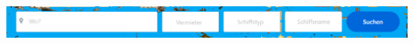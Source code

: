 \documentclass[12pt]{article}
\theoremstyle{definition}
\begin{document}
\begin{center}\includegraphics[width=15cm,height=20cm,keepaspectratio]{Startseite2.png}\end{center}
\end{document}
